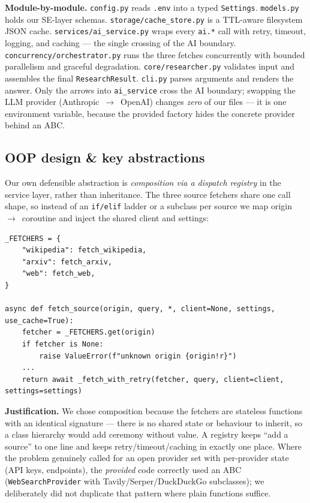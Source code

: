 \documentclass[11pt,a4paper]{article}
\begin{document}
\textbf{Module-by-module.}
\texttt{config.py} reads \texttt{.env} into a typed \texttt{Settings}.
\texttt{models.py} holds our SE-layer schemas.
\texttt{storage/cache\_store.py} is a TTL-aware filesystem JSON cache.
\texttt{services/ai\_service.py} wraps every \texttt{ai.*} call with retry, timeout, logging,
and caching --- the single crossing of the AI boundary.
\texttt{concurrency/orchestrator.py} runs the three fetches concurrently with bounded
parallelism and graceful degradation.
\texttt{core/researcher.py} validates input and assembles the final \texttt{ResearchResult}.
\texttt{cli.py} parses arguments and renders the answer.
Only the arrows into \texttt{ai\_service} cross the AI boundary; swapping the LLM provider
(Anthropic~$\rightarrow$~OpenAI) changes \emph{zero} of our files --- it is one environment
variable, because the provided factory hides the concrete provider behind an ABC.

\subsection{OOP design \& key abstractions}

Our own defensible abstraction is \emph{composition via a dispatch registry} in the service
layer, rather than inheritance. The three source fetchers share one call shape, so instead of
an \texttt{if/elif} ladder or a subclass per source we map origin~$\rightarrow$~coroutine and
inject the shared client and settings:

\begin{lstlisting}[style=python]
_FETCHERS = {
    "wikipedia": fetch_wikipedia,
    "arxiv": fetch_arxiv,
    "web": fetch_web,
}

async def fetch_source(origin, query, *, client=None, settings, use_cache=True):
    fetcher = _FETCHERS.get(origin)
    if fetcher is None:
        raise ValueError(f"unknown origin {origin!r}")
    ...
    return await _fetch_with_retry(fetcher, query, client=client, settings=settings)
\end{lstlisting}

\textbf{Justification.} We chose composition because the fetchers are stateless functions
with an identical signature --- there is no shared state or behaviour to inherit, so a class
hierarchy would add ceremony without value. A registry keeps ``add a source'' to one line and
keeps retry/timeout/caching in exactly one place. Where the problem genuinely called for an
open provider set with per-provider state (API keys, endpoints), the \emph{provided} code
correctly used an ABC (\texttt{WebSearchProvider} with Tavily/Serper/DuckDuckGo subclasses);
we deliberately did not duplicate that pattern where plain functions suffice.
\end{document}
